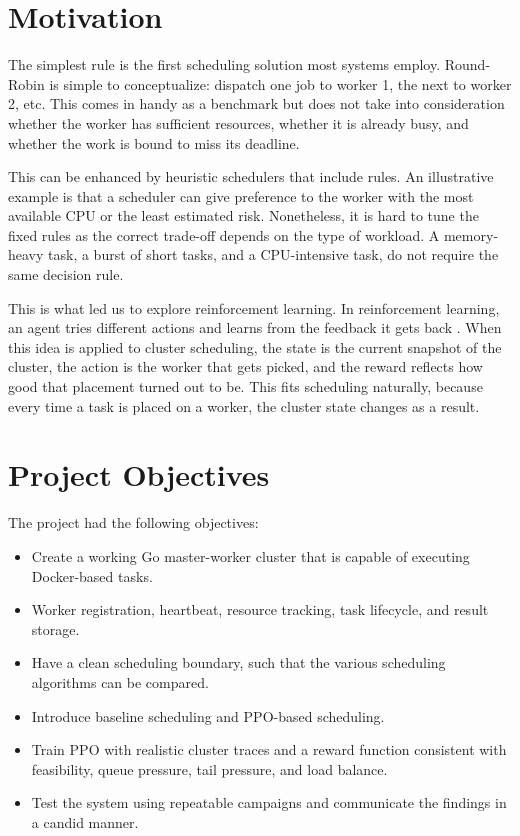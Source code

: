 \section{Motivation}

The simplest rule is the first scheduling solution most systems employ. Round-Robin is simple to conceptualize: dispatch one job to worker 1, the next to worker 2, etc. This comes in handy as a benchmark but does not take into consideration whether the worker has sufficient resources, whether it is already busy, and whether the work is bound to miss its deadline.

This can be enhanced by heuristic schedulers that include rules. An illustrative example is that a scheduler can give preference to the worker with the most available CPU or the least estimated risk. Nonetheless, it is hard to tune the fixed rules as the correct trade-off depends on the type of workload. A memory-heavy task, a burst of short tasks, and a CPU-intensive task, do not require the same decision rule.

This is what led us to explore reinforcement learning. In reinforcement learning, an agent tries different actions and learns from the feedback it gets back \cite{sutton2018reinforcement}. When this idea is applied to cluster scheduling, the state is the current snapshot of the cluster, the action is the worker that gets picked, and the reward reflects how good that placement turned out to be. This fits scheduling naturally, because every time a task is placed on a worker, the cluster state changes as a result.

\section{Project Objectives}
\label{section:proj_obj}

The project had the following objectives:

\begin{itemize}
    \item Create a working Go master-worker cluster that is capable of executing Docker-based tasks.
    \item Worker registration, heartbeat, resource tracking, task lifecycle, and result storage.
    \item Have a clean scheduling boundary, such that the various scheduling algorithms can be compared.
    \item Introduce baseline scheduling and PPO-based scheduling.
    \item Train PPO with realistic cluster traces and a reward function consistent with feasibility, queue pressure, tail pressure, and load balance.
    \item Test the system using repeatable campaigns and communicate the findings in a candid manner.
\end{itemize}

